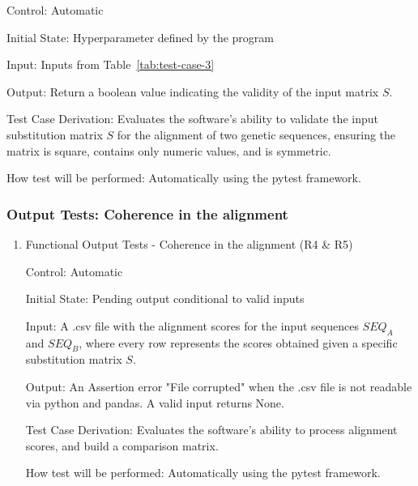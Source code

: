 \documentclass[12pt, titlepage]{article}
\begin{document}
\begin{enumerate}
Control: Automatic
					
Initial State: Hyperparameter defined by the program 
					
Input: Inputs from Table~\ref{tab:test-case-3} 

					
Output: Return a boolean value indicating the validity of the input matrix $S$.

Test Case Derivation: Evaluates the software's ability to validate the input substitution matrix $S$ for the
alignment of two genetic sequences, ensuring the matrix is square, contains only numeric values, and is symmetric.


How test will be performed: Automatically using the pytest framework.

\end{enumerate}
\subsubsection{Output Tests: Coherence in the alignment}
\begin{enumerate}

\item{Functional Output Tests - Coherence in the alignment (R4 \& R5)\\}

Control: Automatic
					
Initial State: Pending output conditional to valid inputs
					
Input: A .csv file with the alignment scores for the input sequences $SEQ_A$ and $SEQ_B$, where 
every row represents the scores obtained given a specific substitution matrix $S$.
					
Output: An Assertion error "File corrupted" when the .csv file is not readable via python and pandas. A 
valid input returns None.

Test Case Derivation: Evaluates the software's ability to process alignment scores, and build a comparison matrix.


How test will be performed: Automatically using the pytest framework.


\end{enumerate}
\end{document}
